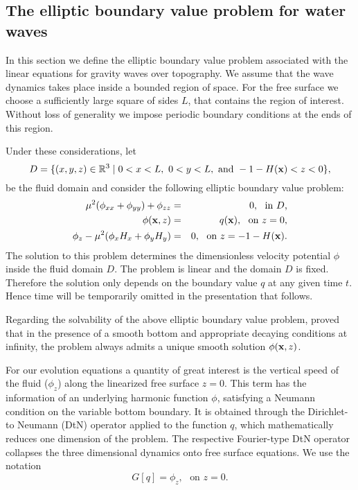 \subsection{The elliptic  boundary value problem for water waves}


In this section we define the elliptic boundary value problem associated with the linear equations for gravity waves over topography. We assume that the wave dynamics takes place inside a bounded region of space. 
For the free surface we choose a sufficiently large square of sides $L$, that contains the region of interest. Without loss of generality we impose periodic boundary conditions at the ends of this region.

Under these considerations, let 
\begin{equation}\label{S2:Eq01}
D = \{(x,y,z)\in\mathbb{R}^3 \mid 0 <x< L,\ 0 <y<L ,\ \text{and\ } -1-H(\x)<z<0\},
\end{equation}
be the fluid domain and consider the following elliptic boundary value problem: 
\begin{eqnarray}
\mu^2(\phi_{xx}+\phi_{yy})+\phi_{zz}&=& 0,\ \ \text{in $D$,}\label{S2:Eq02}\\
\phi(\bold{x},z) &=& q(\bold{x}),\ \ \text{on $z=0$,}\label{S2:Eq03}\\
\phi_{z} - \mu^2(\phi_{x}H_x + \phi_{y}H_y) &=& 0,\ \ \text{on $z=-1-H(\bold{x})$.}\label{S2:Eq04}
\end{eqnarray}
The solution to this problem determines the dimensionless velocity potential $\phi$ inside the fluid domain $D$. The problem is linear and the domain $D$ is fixed. Therefore the solution only depends on the boundary value $q$ at any given time $t$.
Hence time will be temporarily omitted in the presentation that follows.

Regarding the solvability of the above elliptic boundary value problem, \citet{Lannes2005} proved that in the presence of a smooth bottom and appropriate decaying conditions at infinity, the problem always admits a unique smooth solution $\phi(\bold{x},z)$.

For our evolution equations a quantity of great interest is the vertical speed of the fluid ($\phi_z$) along 
the linearized free surface $z = 0$. This term has the information of an underlying harmonic function $\phi$, satisfying a Neumann 
condition on the variable bottom boundary. 
It  is obtained through the Dirichlet-to Neumann (DtN) operator applied to the function $q$, which mathematically 
reduces  one dimension of the problem.  The respective Fourier-type DtN operator 
collapses the three dimensional dynamics onto  free surface equations. We use the notation
\begin{equation}\label{S2:Eq05}
G[q] = \phi_z,\ \ \ \text{on $z = 0$}.
\end{equation}


